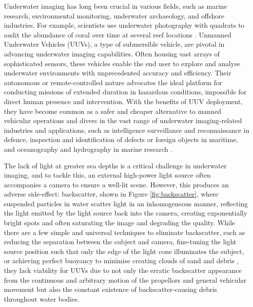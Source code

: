 Underwater imaging has long been crucial in various fields, such as marine research, environmental monitoring, underwater archaeology, and offshore industries. For example, scientists use underwater photography with quadrats to audit the abundance of coral over time at several reef locations \cite{universityofhawaiiPracticesScienceUnderwater}. Unmanned Underwater Vehicles (UUVs), a type of submersible vehicle, are pivotal in advancing underwater imaging capabilities. Often housing vast arrays of sophisticated sensors, these vehicles enable the end user to explore and analyse underwater environments with unprecedented accuracy and efficiency. Their autonomous or remote-controlled nature advocates the ideal platform for conducting missions of extended duration in hazardous conditions, impossible for direct human presence and intervention. With the benefits of UUV deployment, they have become common as a safer and cheaper alternative to manned vehicular operations and divers in the vast range of underwater imaging-related industries and applications, such as intelligence surveillance and reconnaissance in defence, inspection and identification of defects or foreign objects in maritime, and oceanography and hydrography in marine research \cite{yannickallardUnmannedUnderwaterVehicle2014}.

The lack of light at greater sea depths is a critical challenge in underwater imaging, and to tackle this, an external high-power light source often accompanies a camera to ensure a well-lit scene. However, this produces an adverse side-effect: backscatter, shown in Figure \ref{fig:backscatter}, where suspended particles in water scatter light in an inhomogeneous manner, reflecting the light emitted by the light source back into the camera, creating exponentially bright spots and often saturating the image and degrading the quality. While there are a few simple and universal techniques to eliminate backscatter, such as reducing the separation between the subject and camera, fine-tuning the light source position such that only the edge of the light cone illuminates the subject, or achieving perfect buoyancy to minimise creating clouds of sand and debris \cite{brentdurandEasyWaysEliminate2013}, they lack viability for UUVs due to not only the erratic backscatter appearance from the continuous and arbitrary motion of the propellors and general vehicular movement but also the constant existence of backscatter-causing debris throughout water bodies.

